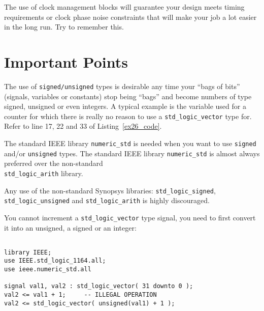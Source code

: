 The use of clock management blocks will guarantee your design meets timing requirements or clock phase noise constraints that will make your job a lot easier in the long run. Try to remember this.

\section{Important Points}

\begin{my_list}
\item The use of \texttt{signed/unsigned} types is desirable any time your ``bags of bits'' (signals, variables or constants) stop being ``bags'' and become numbers of type signed, unsigned or even integers. A typical example is the variable used for a counter for which there is really no reason to use a \texttt{std\_logic\_vector} type for. Refer to line 17, 22 and 33 of Listing~\ref{ex26_code}.

\item The standard IEEE library \texttt{numeric\_std} is needed when you want to use \texttt{signed} and/or \texttt{unsigned} types. The standard IEEE library \texttt{numeric\_std} is almost always preferred over the non-standard\\ \texttt{std\_logic\_arith} library.
\item Any use of the non-standard Synopsys libraries: \texttt{std\_logic\_signed}, \texttt{std\_logic\_unsigned} and \texttt{std\_logic\_arith} is highly discouraged.
\item You cannot increment a \texttt{std\_logic\_vector} type signal, you need to first convert it into an unsigned, a signed or an integer:

\noindent
\begin{minipage}{0.99\linewidth}
\begin{lstlisting}

library IEEE;
use IEEE.std_logic_1164.all;
use ieee.numeric_std.all

signal val1, val2 : std_logic_vector( 31 downto 0 );
val2 <= val1 + 1;     -- ILLEGAL OPERATION
val2 <= std_logic_vector( unsigned(val1) + 1 );
\end{lstlisting}
\end{minipage}

\end{my_list}

